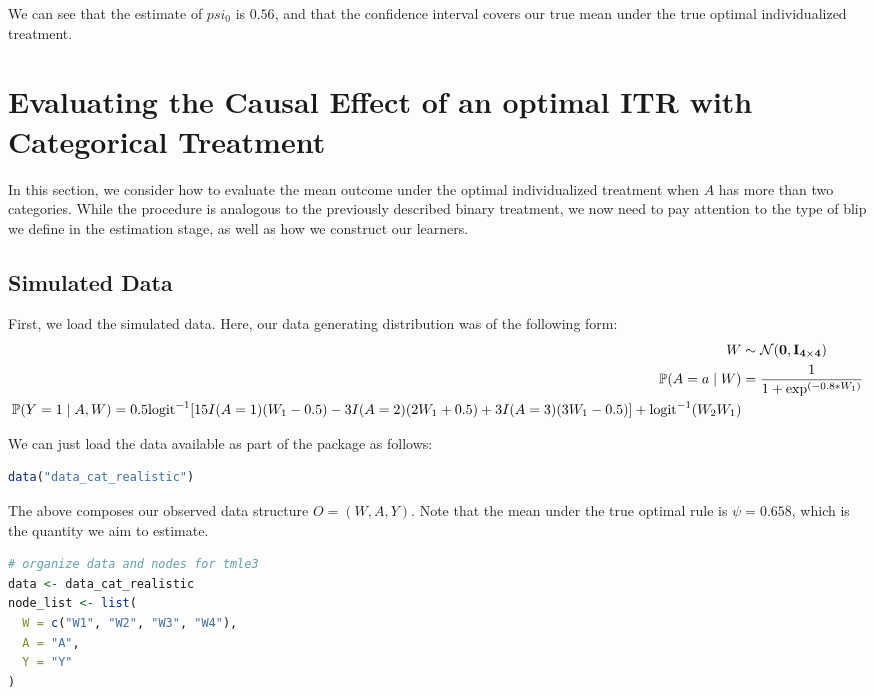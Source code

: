 \documentclass[12pt, krantz2,]{krantz}
\theoremstyle{definition}
\theoremstyle{definition}
\theoremstyle{definition}
\renewcommand{\P}{\mathbb{P}}
\newcommand{\1}{\mathbbm{1}}
\begin{document}
We can see that the estimate of \(psi_0\) is \(0.56\), and that the confidence
interval covers our true mean under the true optimal individualized treatment.

\hypertarget{oit-eval-cat}{%
\section{Evaluating the Causal Effect of an optimal ITR with Categorical Treatment}\label{oit-eval-cat}}

In this section, we consider how to evaluate the mean outcome under the optimal
individualized treatment when \(A\) has more than two categories. While the
procedure is analogous to the previously described binary treatment, we now need
to pay attention to the type of blip we define in the estimation stage, as well
as how we construct our learners.

\hypertarget{simulated-data-1}{%
\subsection{Simulated Data}\label{simulated-data-1}}

First, we load the simulated data. Here, our data generating distribution was
of the following form:
\begin{align*}
  W &\sim \mathcal{N}(\bf{0},I_{4 \times 4})\\
  \P(A=a \mid W) &= \frac{1}{1+\exp^{(-0.8*W_1)}}\\
  \P(Y=1 \mid A,W) = 0.5\text{logit}^{-1}[15I(A=1)(W_1-0.5) -
    3I(A=2)(2W_1+0.5) +
    3I(A=3)(3W_1-0.5)] +\text{logit}^{-1}(W_2W_1)
\end{align*}

We can just load the data available as part of the package as follows:

\begin{lstlisting}[language=R]
data("data_cat_realistic")
\end{lstlisting}

The above composes our observed data structure \(O = (W, A, Y)\). Note that the
mean under the true optimal rule is \(\psi=0.658\), which is the quantity we aim
to estimate.

\begin{lstlisting}[language=R]
# organize data and nodes for tmle3
data <- data_cat_realistic
node_list <- list(
  W = c("W1", "W2", "W3", "W4"),
  A = "A",
  Y = "Y"
)
\end{lstlisting}
\end{document}
